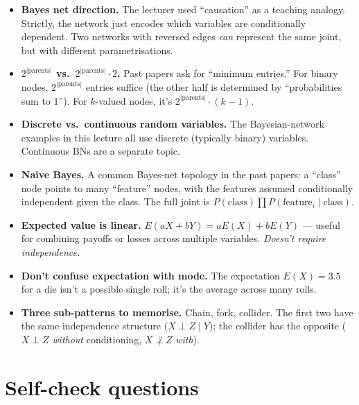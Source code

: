\documentclass[11pt, a4paper]{article}
\begin{document}
\begin{itemize}
  \item \textbf{Bayes net direction.} The lecturer used ``causation'' as a teaching analogy. Strictly, the network just encodes which variables are conditionally dependent. Two networks with reversed edges \emph{can} represent the same joint, but with different parametrisations.
  \item \textbf{$2^{|\mathrm{parents}|}$ vs.\ $2^{|\mathrm{parents}|} \cdot 2$.} Past papers ask for ``minimum entries.'' For binary nodes, $2^{|\mathrm{parents}|}$ entries suffice (the other half is determined by ``probabilities sum to 1''). For $k$-valued nodes, it's $2^{|\mathrm{parents}|} \cdot (k - 1)$.
  \item \textbf{Discrete vs.\ continuous random variables.} The Bayesian-network examples in this lecture all use discrete (typically binary) variables. Continuous BNs are a separate topic.
  \item \textbf{Naive Bayes.} A common Bayes-net topology in the past papers: a ``class'' node points to many ``feature'' nodes, with the features assumed conditionally independent given the class. The full joint is $P(\text{class}) \prod P(\text{feature}_i \mid \text{class})$.
  \item \textbf{Expected value is linear.} $E(aX + bY) = a E(X) + b E(Y)$ — useful for combining payoffs or losses across multiple variables. \emph{Doesn't require independence.}
  \item \textbf{Don't confuse expectation with mode.} The expectation $E(X) = 3.5$ for a die isn't a possible single roll; it's the average across many rolls.
  \item \textbf{Three sub-patterns to memorise.} Chain, fork, collider. The first two have the same independence structure ($X \perp Z \mid Y$); the collider has the opposite ($X \perp Z$ \emph{without} conditioning, $X \not\perp Z$ \emph{with}).
\end{itemize}

\section*{Self-check questions}
\end{document}
